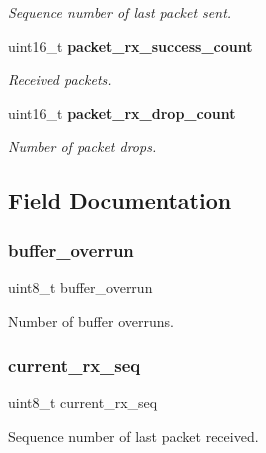 \begin{DoxyCompactItemize}
\begin{DoxyCompactList}\small\item\em Sequence number of last packet sent. \end{DoxyCompactList}\item 
uint16\+\_\+t \textbf{ packet\+\_\+rx\+\_\+success\+\_\+count}
\begin{DoxyCompactList}\small\item\em Received packets. \end{DoxyCompactList}\item 
uint16\+\_\+t \textbf{ packet\+\_\+rx\+\_\+drop\+\_\+count}
\begin{DoxyCompactList}\small\item\em Number of packet drops. \end{DoxyCompactList}\end{DoxyCompactItemize}


\subsection{Field Documentation}
\mbox{\label{struct____mavlink__status_a46645179d13142df11bbf65dd46e3763}} 
\subsubsection{buffer\+\_\+overrun}
{\footnotesize\ttfamily uint8\+\_\+t buffer\+\_\+overrun}



Number of buffer overruns. 

\mbox{\label{struct____mavlink__status_adbf19b3f1f3bbabeac55dc07dc7ec421}} 
\subsubsection{current\+\_\+rx\+\_\+seq}
{\footnotesize\ttfamily uint8\+\_\+t current\+\_\+rx\+\_\+seq}



Sequence number of last packet received. 

